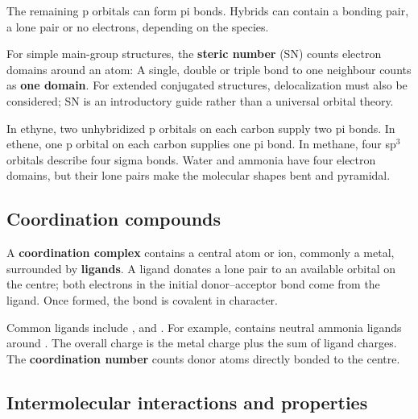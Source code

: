\documentclass[a4paper,10pt]{article}
\begin{document}
The remaining p orbitals can form pi bonds. Hybrids can contain a bonding pair,
a lone pair or no electrons, depending on the species.

For simple main-group structures, the \textbf{steric number} (SN) counts electron
domains around an atom:
A single, double or triple bond to one neighbour counts as \textbf{one domain}.
For extended conjugated structures, delocalization must also be considered;
SN is an introductory guide rather than a universal orbital theory.

In ethyne, two unhybridized p orbitals on each carbon supply two pi bonds.
In ethene, one p orbital on each carbon supplies one pi bond. In methane, four
sp$^3$ orbitals describe four sigma bonds. Water and ammonia have four electron
domains, but their lone pairs make the molecular shapes bent and pyramidal.

\subsection{Coordination compounds}
A \textbf{coordination complex} contains a central atom or ion, commonly a metal,
surrounded by \textbf{ligands}. A ligand donates a lone pair to an available
orbital on the centre; both electrons in the initial donor--acceptor bond come
from the ligand. Once formed, the bond is covalent in character.

Common ligands include ,  and . For example,
 contains neutral ammonia ligands around .
The overall charge is the metal charge plus the sum of ligand charges.
The \textbf{coordination number} counts donor atoms directly bonded to the centre.

\subsection{Intermolecular interactions and properties}
\end{document}
